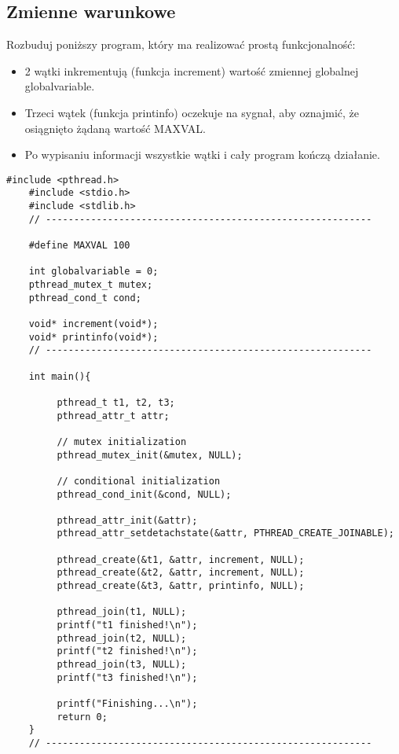 \documentclass[a4paper,15pt]{article}
\newcommand{\assignment}[2]{
    \begin{tcolorbox}[colback=black!5!white,colframe=black,title={Zadanie #1}]
        #2
    \end{tcolorbox}
}
\begin{document}
\subsection{Zmienne warunkowe}
\assignment{4}{
Rozbuduj poniższy program, który ma realizować prostą funkcjonalność:
\begin{itemize}
\item 2 wątki inkrementują (funkcja increment) wartość zmiennej globalnej globalvariable.
\item Trzeci wątek (funkcja printinfo) oczekuje na sygnał, aby oznajmić, że osiągnięto żądaną wartość MAXVAL.
\item Po wypisaniu informacji wszystkie wątki i cały program kończą działanie.
\end{itemize}
}
\begin{lstlisting}[style=CStyle, label=some-code, caption=Zadanie 4 - cond.c]
#include <pthread.h>
    #include <stdio.h>
    #include <stdlib.h>
    // ----------------------------------------------------------
     
    #define MAXVAL 100
     
    int globalvariable = 0;
    pthread_mutex_t mutex;
    pthread_cond_t cond;
     
    void* increment(void*);
    void* printinfo(void*);
    // ----------------------------------------------------------
     
    int main(){
     
         pthread_t t1, t2, t3;
         pthread_attr_t attr;
     
         // mutex initialization
         pthread_mutex_init(&mutex, NULL);
     
         // conditional initialization
         pthread_cond_init(&cond, NULL);
     
         pthread_attr_init(&attr);
         pthread_attr_setdetachstate(&attr, PTHREAD_CREATE_JOINABLE);
     
         pthread_create(&t1, &attr, increment, NULL); 
         pthread_create(&t2, &attr, increment, NULL);
         pthread_create(&t3, &attr, printinfo, NULL);  
     
         pthread_join(t1, NULL);
         printf("t1 finished!\n");
         pthread_join(t2, NULL);
         printf("t2 finished!\n");
         pthread_join(t3, NULL);
         printf("t3 finished!\n");
     
         printf("Finishing...\n");
         return 0;
    }
    // ----------------------------------------------------------
     

\end{lstlisting}
\end{document}
